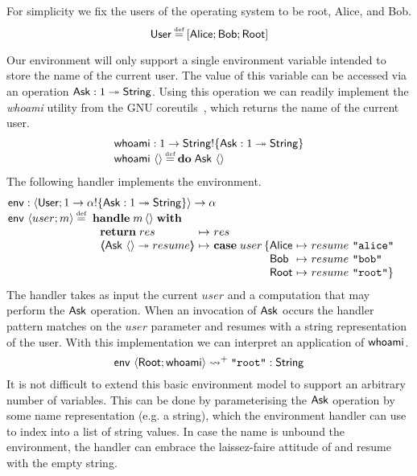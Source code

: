 \documentclass[12pt,phd,lfcs,twoside,openright,logo,leftchapter,normalheadings]{infthesis}
\theoremstyle{plain}
\theoremstyle{definition}
\begin{document}
For simplicity we fix the users of the operating system to be root,
Alice, and Bob.
%
\[
  \User \defas [\Alice;\Bob;\Root]
\]

Our environment will only support a single environment variable
intended to store the name of the current user. The value of this
variable can be accessed via an operation $\mathsf{Ask} : 1 \twoheadrightarrow \mathsf{String}$.
%
%
Using this operation we can readily implement the \emph{whoami}
utility from the GNU coreutils~\cite[Section~20.3]{MacKenzieMPPBYS20},
which returns the name of the current user.
%
\[
  \bl
    \whoami : \UnitType \to \String \eff \{\Ask : \UnitType \opto \String\}\\
    \whoami~\Unit \defas \Do\;\Ask~\Unit
  \el
\]
%
The following handler implements the environment.
%
\[
  \bl
    \environment : \Record{\User;\UnitType \to \alpha \eff \{\Ask : \UnitType \opto \String\}} \to \alpha\\
    \environment~\Record{user;m} \defas
       \ba[t]{@{~}l}
         \Handle\;m\,\Unit\;\With\\
           ~\ba{@{~}l@{~}c@{~}l}
              \Return\;res &\mapsto& res\\
              \OpCase{\Ask}{\Unit}{resume} &\mapsto&
                \bl
                  \Case\;user\,\{
                  \ba[t]{@{}l@{~}c@{~}l}
                    \Alice &\mapsto& resume~\strlit{alice}\\
                    \Bob   &\mapsto& resume~\strlit{bob}\\
                    \Root  &\mapsto& resume~\strlit{root}\}
                   \ea
                \el
           \ea
       \ea
  \el
\]
%
The handler takes as input the current $user$ and a computation that
may perform the $\mathsf{Ask}$ operation. When an invocation of $\mathsf{Ask}$ occurs
the handler pattern matches on the $user$ parameter and resumes with a
string representation of the user. With this implementation we can
interpret an application of $\mathsf{whoami}$.
%
\[
  \mathsf{env}~\langle \mathsf{Root};\mathsf{whoami} \rangle \leadsto^+ \texttt{"root"} : \mathsf{String}
\]
%
It is not difficult to extend this basic environment model to support
an arbitrary number of variables. This can be done by parameterising
the $\mathsf{Ask}$ operation by some name representation (e.g. a string),
which the environment handler can use to index into a list of string
values. In case the name is unbound the environment, the handler can
embrace the laissez-faire attitude of \UNIX{} and resume with the
empty string.
\end{document}
